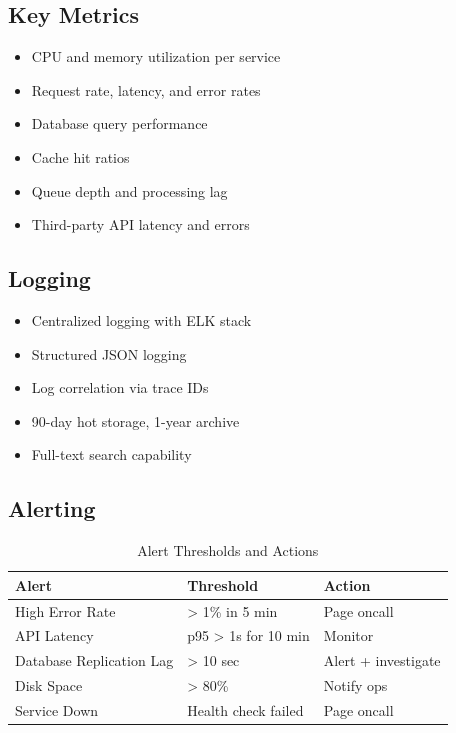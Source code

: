 \documentclass[12pt,a4paper]{report}
\begin{document}
\subsection{Key Metrics}

\begin{itemize}[label=\textbullet]
    \item CPU and memory utilization per service
    \item Request rate, latency, and error rates
    \item Database query performance
    \item Cache hit ratios
    \item Queue depth and processing lag
    \item Third-party API latency and errors
\end{itemize}

\subsection{Logging}

\begin{itemize}[label=\textbullet]
    \item Centralized logging with ELK stack
    \item Structured JSON logging
    \item Log correlation via trace IDs
    \item 90-day hot storage, 1-year archive
    \item Full-text search capability
\end{itemize}

\subsection{Alerting}

\begin{table}[H]
\centering
\small
\begin{tabular}{|l|l|l|}
\hline
\textbf{Alert} & \textbf{Threshold} & \textbf{Action} \\
\hline
High Error Rate & > 1\% in 5 min & Page oncall \\
API Latency & p95 > 1s for 10 min & Monitor \\
Database Replication Lag & > 10 sec & Alert + investigate \\
Disk Space & > 80\% & Notify ops \\
Service Down & Health check failed & Page oncall \\
\hline
\end{tabular}
\caption{Alert Thresholds and Actions}
\end{table}
\end{document}
